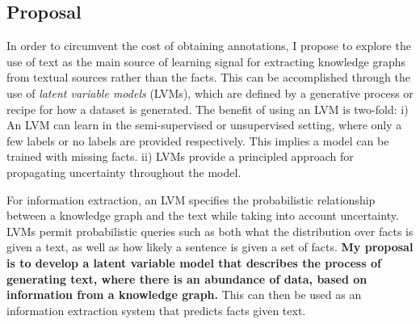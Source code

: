 \documentclass[12pt]{article}
\begin{document}
\subsection*{Proposal}
In order to circumvent the cost of obtaining annotations, I propose to explore the use of text as the main source of learning signal for extracting knowledge graphs from textual sources rather than the facts. This can be accomplished through the use of \textit{latent variable models} (LVMs), which are defined
by a generative process or recipe for how a dataset is generated.
The benefit of using an LVM is two-fold:
i) An LVM can learn in the semi-supervised or unsupervised setting,
where only a few labels or no labels are provided respectively.
This implies a model can be trained with missing facts.
ii) LVMs provide a principled approach for propagating uncertainty throughout the model. 

For information extraction, an LVM specifies the probabilistic relationship between a knowledge graph and the text while taking into account uncertainty. LVMs permit probabilistic queries such as both what the distribution over facts is given a text, as well as how likely a sentence is given a set of facts. \textbf{My proposal is to develop a latent variable model that describes the process of generating text, where there is an abundance of data, based on information from a knowledge graph.} This can then be used as an information extraction system that predicts facts given text.



\end{document}
